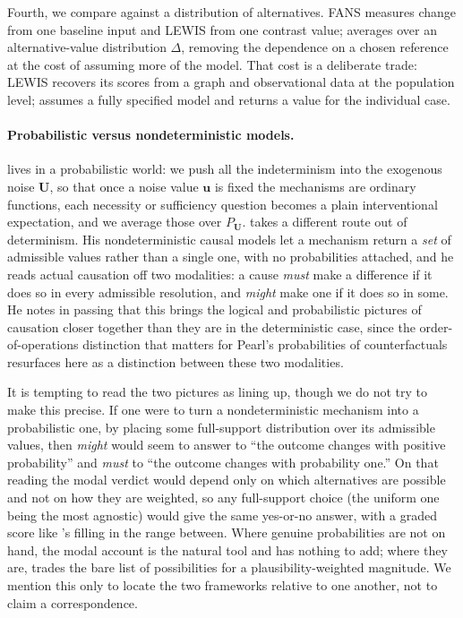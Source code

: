 Fourth, we compare against a distribution of alternatives.
FANS measures change from one baseline input and LEWIS from one contrast value;
\ourapproach{} averages over an alternative-value distribution $\Delta$, removing the
dependence on a chosen reference at the cost of assuming more of the model. That cost is a
deliberate trade: LEWIS recovers its scores from a graph and observational data at the
population level; \ourapproach{} assumes a fully specified model and returns a
value for the individual case.

\paragraph{Probabilistic versus nondeterministic models.}
\ourapproach lives in a probabilistic world: we push all the indeterminism into the
exogenous noise $\mathbf{U}$, so that once a noise value $\mathbf{u}$ is fixed the
mechanisms are ordinary functions, each necessity or sufficiency question becomes a
plain interventional expectation, and we average those over $P_{\mathbf{U}}$.
\citet{beckers2025nondeterministic} takes a different route out of determinism. His
nondeterministic causal models let a mechanism return a \emph{set} of admissible values
rather than a single one, with no probabilities attached, and he reads actual causation
off two modalities: a cause \emph{must} make a difference if it does so in every
admissible resolution, and \emph{might} make one if it does so in some. He notes in
passing that this brings the logical and probabilistic pictures of causation closer
together than they are in the deterministic case, since the order-of-operations
distinction that matters for Pearl's probabilities of counterfactuals resurfaces here
as a distinction between these two modalities.

It is tempting to read the two pictures as lining up, though we do not try to make this
precise. If one were to turn a nondeterministic mechanism into a probabilistic one, by
placing some full-support distribution over its admissible values, then \emph{might}
would seem to answer to ``the outcome changes with positive probability'' and
\emph{must} to ``the outcome changes with probability one.'' On that reading the modal
verdict would depend only on which alternatives are possible and not on how they are
weighted, so any full-support choice (the uniform one being the most agnostic)
would give the same yes-or-no answer, with a graded score like \ourapproach's filling
in the range between. Where genuine probabilities are not on hand, the modal account is
the natural tool and \ourapproach has nothing to add; where they are, \ourapproach
trades the bare list of possibilities for a plausibility-weighted magnitude. We mention
this only to locate the two frameworks relative to one another, not to claim a
correspondence.

